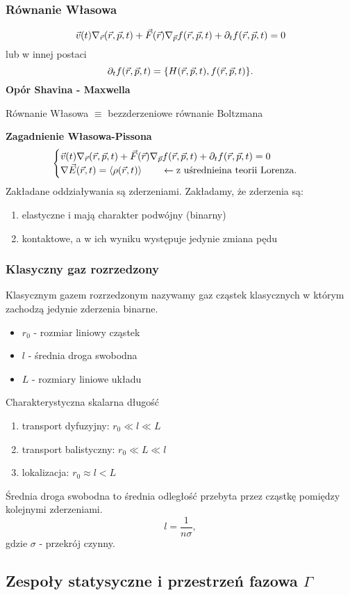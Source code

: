 \subsubsection{Równanie Własowa}
\begin{equation}
\vec{v}(t) \nabla_{\vec{r}} (\vec{r},\vec{p},t) + \vec{F}(\vec{r}) \nabla_{\vec{p}}f(\vec{r},\vec{p},t) +\partial_t f(\vec{r},\vec{p},t) =0
\end{equation}
lub w innej postaci
\begin{equation}
\partial_t f(\vec{r},\vec{p},t) = \{ H(\vec{r},\vec{p},t),f(\vec{r},\vec{p},t)\}.
\end{equation}
\textbf{Opór Shavina - Maxwella}
\begin{center}
Równanie Własowa $\equiv$ bezzderzeniowe równanie Boltzmana
\end{center}
\textbf{Zagadnienie Własowa-Pissona}
$$\begin{cases}
\vec{v}(t) \nabla_{\vec{r}} (\vec{r},\vec{p},t) + \vec{F}(\vec{r}) \nabla_{\vec{p}}f(\vec{r},\vec{p},t) +\partial_t f(\vec{r},\vec{p},t) =0&\\
\nabla \vec{E} (\vec{r},t) = \left< \rho (\vec{r},t) \right>  \qquad \leftarrow \mbox{z uśrednieina teorii Lorenza}.& 
\end{cases}$$
Zakładane oddziaływania są zderzeniami. Zakładamy, że zderzenia są:
\begin{enumerate}
\item elastyczne i mają charakter podwójny (binarny)
\item kontaktowe, a w ich wyniku występuje jedynie zmiana pędu
\end{enumerate}
\subsubsection{Klasyczny gaz rozrzedzony}
Klasycznym gazem rozrzedzonym nazywamy gaz cząstek klasycznych w którym zachodzą jedynie zderzenia binarne.
\begin{itemize}
\item[] $r_0$ - rozmiar liniowy cząstek
\item[] $l$ - średnia droga swobodna
\item[] $L$ - rozmiary liniowe układu
\end{itemize}
Charakterystyczna skalarna długość 
\begin{enumerate}
\item transport dyfuzyjny: $r_0 \ll l \ll L$
\item transport balistyczny: $r_0 \ll L \ll l$
\item lokalizacja: $r_0 \approx l < L$
\end{enumerate}
Średnia droga swobodna to średnia odległość przebyta przez cząstkę pomiędzy kolejnymi zderzeniami.
\begin{equation}
l=\dfrac{1}{n\sigma},
\end{equation}
gdzie $\sigma$ - przekrój czynny.
\subsection{Zespoły statysyczne i przestrzeń fazowa $\Gamma$}

